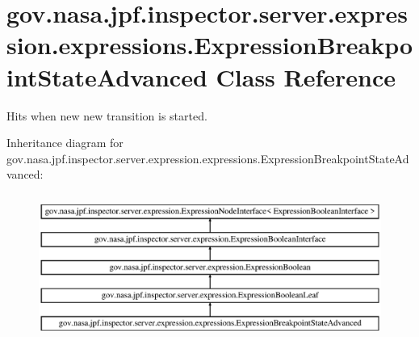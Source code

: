 \hypertarget{classgov_1_1nasa_1_1jpf_1_1inspector_1_1server_1_1expression_1_1expressions_1_1_expression_breakpoint_state_advanced}{}\section{gov.\+nasa.\+jpf.\+inspector.\+server.\+expression.\+expressions.\+Expression\+Breakpoint\+State\+Advanced Class Reference}
\label{classgov_1_1nasa_1_1jpf_1_1inspector_1_1server_1_1expression_1_1expressions_1_1_expression_breakpoint_state_advanced}


Hits when new new transition is started.  


Inheritance diagram for gov.\+nasa.\+jpf.\+inspector.\+server.\+expression.\+expressions.\+Expression\+Breakpoint\+State\+Advanced\+:\begin{figure}[H]
\begin{center}
\leavevmode
\includegraphics[height=4.827586cm]{classgov_1_1nasa_1_1jpf_1_1inspector_1_1server_1_1expression_1_1expressions_1_1_expression_breakpoint_state_advanced}
\end{center}
\end{figure}
